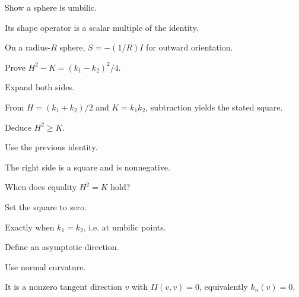 \begin{exercise}\label{exr:vii17-14}
Show a sphere is umbilic.
\end{exercise}
\begin{hint}
Its shape operator is a scalar multiple of the identity.
\end{hint}
\begin{solution}
On a radius-\(R\) sphere, \(S=-(1/R)I\) for outward orientation.
\end{solution}

\begin{exercise}\label{exr:vii17-15}
Prove \(H^2-K=(k_1-k_2)^2/4\).
\end{exercise}
\begin{hint}
Expand both sides.
\end{hint}
\begin{solution}
From \(H=(k_1+k_2)/2\) and \(K=k_1k_2\), subtraction yields the stated square.
\end{solution}

\begin{exercise}\label{exr:vii17-16}
Deduce \(H^2\ge K\).
\end{exercise}
\begin{hint}
Use the previous identity.
\end{hint}
\begin{solution}
The right side is a square and is nonnegative.
\end{solution}

\begin{exercise}\label{exr:vii17-17}
When does equality \(H^2=K\) hold?
\end{exercise}
\begin{hint}
Set the square to zero.
\end{hint}
\begin{solution}
Exactly when \(k_1=k_2\), i.e. at umbilic points.
\end{solution}

\begin{exercise}\label{exr:vii17-18}
Define an asymptotic direction.
\end{exercise}
\begin{hint}
Use normal curvature.
\end{hint}
\begin{solution}
It is a nonzero tangent direction \(v\) with \(II(v,v)=0\), equivalently \(k_n(v)=0\).
\end{solution}

